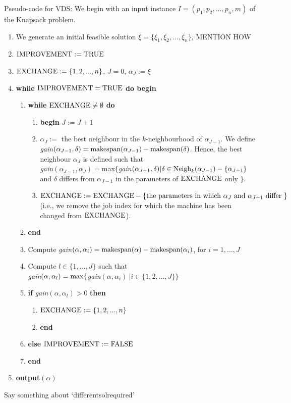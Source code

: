 \documentclass[12pt,a4paper,reqno]{article}
\begin{document}
Pseudo-code for VDS:
We begin with an input instance $I = (p_1,p_2,...,p_n,m)$ of the Knapsack problem. 
\begin{enumerate}
\item We generate an initial feasible solution $\xi = \{\xi_1,\xi_2,...,\xi_n\}$, \color{red} MENTION HOW \color{black}
\item $\textnormal{IMPROVEMENT} := \textnormal{TRUE}$
\item $\textnormal{EXCHANGE} := \{1,2,...,n\}$, $J=0$, $\alpha_J := \xi$
\item \textbf{while} $\textnormal{IMPROVEMENT} = \textnormal{TRUE}$ \textbf{do begin}
\begin{enumerate}
\item \textbf{while} $\textnormal{EXCHANGE} \neq \emptyset$ \textbf{do}
\begin{enumerate}
\item \textbf{begin} $J := J+1$
\item $\alpha_J := $ the best neighbour in the $k$-neighbourhood of $\alpha_{J-1}$. We define \textit{gain}$(\alpha_{J-1}, \delta) = \textnormal{makespan}(\alpha_{J-1}) - \textnormal{makespan}(\delta)$. Hence, the best neighbour $\alpha_J$ is defined such that \\ \textit{gain}$(\alpha_{J-1},\alpha_J) = $max$\{$\textit{gain}$(\alpha_{J-1},\delta) | \delta \in \textnormal{Neigh}_k(\alpha_{J-1}) - \{\alpha_{J-1} \}$ and $\delta$ differs from $\alpha_{J-1}$ in the parameters of $\textnormal{EXCHANGE}$ only $\}$.
\item $\textnormal{EXCHANGE} := \textnormal{EXCHANGE} - \{ \textnormal{the parameters in which } \alpha_J \textnormal{ and } \alpha_{J-1} \textnormal{ differ } \}$ (i.e., we remove the job index for which the machine has been changed from $\textnormal{EXCHANGE}$). 
\end{enumerate}
\item \textbf{end}
\item Compute \textit{gain}$(\alpha,\alpha_i) = \textnormal{makespan}(\alpha) - \textnormal{makespan}(\alpha_i)$, for $i=1,...,J$
\item Compute $l \in \{1,...,J\}$ such that \\ \textit{gain}$(\alpha,\alpha_l) = \textnormal{max}\{$\textit{gain}$(\alpha,\alpha_i) \> | i \in \{1,2,...,J\} \}$
\item \textbf{if} \textit{gain}$(\alpha,\alpha_l) > 0$ \textbf{then}
\begin{enumerate}
\item $\textnormal{EXCHANGE} := \{1,2,...,n\}$
\item \textbf{end}
\end{enumerate}
\item \textbf{else} $\textnormal{IMPROVEMENT} := \textnormal{FALSE}$
\item \textbf{end}
\end{enumerate}
\item \textbf{output}$(\alpha)$
\end{enumerate}




Say something about `differentsolrequired'
\end{document}
